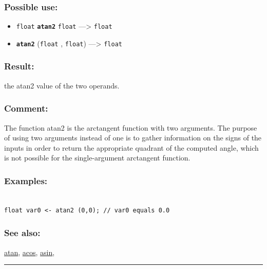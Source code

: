 \documentclass[]{book}
\providecommand{\tightlist}{%
  \setlength{\itemsep}{0pt}\setlength{\parskip}{0pt}}
\theoremstyle{definition}
\theoremstyle{definition}
\theoremstyle{definition}
\theoremstyle{remark}
\begin{document}
\subsubsection{Possible use:}\label{possible-use-60}

\begin{itemize}
\tightlist
\item
  \texttt{float} \textbf{\texttt{atan2}} \texttt{float}
  ---\textgreater{} \texttt{float}
\item
  \textbf{\texttt{atan2}} (\texttt{float} , \texttt{float})
  ---\textgreater{} \texttt{float}
\end{itemize}

\subsubsection{Result:}\label{result-59}

the atan2 value of the two operands.

\subsubsection{Comment:}\label{comment-14}

The function atan2 is the arctangent function with two arguments. The
purpose of using two arguments instead of one is to gather information
on the signs of the inputs in order to return the appropriate quadrant
of the computed angle, which is not possible for the single-argument
arctangent function.

\subsubsection{Examples:}\label{examples-50}

\begin{verbatim}
 
float var0 <- atan2 (0,0); // var0 equals 0.0
\end{verbatim}

\subsubsection{See also:}\label{see-also-42}

\href{operators-a-to-a.html\#atan}{atan},
\href{operators-a-to-a.html\#acos}{acos},
\href{operators-a-to-a.html\#asin}{asin},

\begin{center}\rule{0.5\linewidth}{\linethickness}\end{center}
\end{document}
